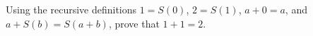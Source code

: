 Using the recursive definitions $1=S(0)$, $2=S(1)$, $a+0=a$, and $a+S(b)=S(a+b)$, prove that $1+1=2$.
